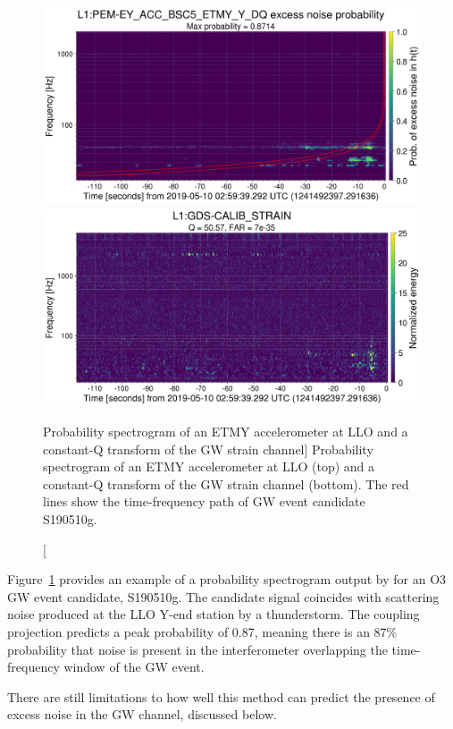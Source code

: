 \begin{figure}
	\includegraphics[width=\textwidth]{figures/noise-studies/vetting-spectrogram1.png}
	\includegraphics[width=\textwidth]{figures/noise-studies/vetting-spectrogram2.png}
	\caption
	[Probability spectrogram of an ETMY accelerometer at LLO and a constant-Q transform of the GW strain channel]
	{
		Probability spectrogram of an ETMY accelerometer at LLO (top) and a constant-Q transform of the GW strain channel (bottom).
		The red lines show the time-frequency path of GW event candidate S190510g.}
	\label{fig:vetting-spectrograms}
\end{figure}

Figure~\ref{fig:vetting-spectrograms} provides an example of a probability spectrogram output by  for an \ac{O3} \ac{GW} event candidate, S190510g.
The candidate signal coincides with scattering noise produced at the \ac{LLO} Y-end station by a thunderstorm.
The coupling projection predicts a peak probability of 0.87, meaning there is an 87\% probability that noise is present in the interferometer overlapping the time-frequency window of the \ac{GW} event.

There are still limitations to how well this method can predict the presence of excess noise in the \ac{GW} channel, discussed below.

